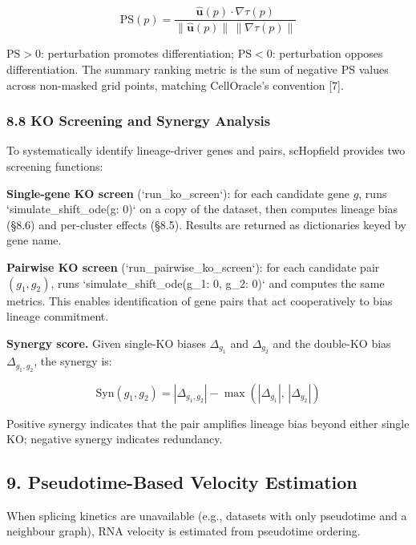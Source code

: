 \documentclass[11pt]{article}
\begin{document}
\begin{equation}
\mathrm{PS}(p) = \frac{\hat{\mathbf{u}}(p) \cdot \nabla\tau(p)}{\|\hat{\mathbf{u}}(p)\|\,\|\nabla\tau(p)\|} 
\end{equation}

$\mathrm{PS} > 0$: perturbation promotes differentiation; $\mathrm{PS} < 0$: perturbation opposes differentiation. The summary ranking metric is the sum of negative PS values across non-masked grid points, matching CellOracle's convention [7].


\subsubsection*{8.8 KO Screening and Synergy Analysis}

To systematically identify lineage-driver genes and pairs, scHopfield provides two screening functions:

\textbf{Single-gene KO screen} (`run\_ko\_screen`): for each candidate gene $g$, runs `simulate\_shift\_ode({g: 0})` on a copy of the dataset, then computes lineage bias (§8.6) and per-cluster effects (§8.5). Results are returned as dictionaries keyed by gene name.

\textbf{Pairwise KO screen} (`run\_pairwise\_ko\_screen`): for each candidate pair $(g_1, g_2)$, runs `simulate\_shift\_ode({g\_1: 0, g\_2: 0})` and computes the same metrics. This enables identification of gene pairs that act cooperatively to bias lineage commitment.

\textbf{Synergy score.} Given single-KO biases $\Delta_{g_1}$ and $\Delta_{g_2}$ and the double-KO bias $\Delta_{g_1,g_2}$, the synergy is:

\begin{equation}
\mathrm{Syn}(g_1, g_2) = |\Delta_{g_1,g_2}| - \max\!\left(|\Delta_{g_1}|,\, |\Delta_{g_2}|\right) 
\end{equation}

Positive synergy indicates that the pair amplifies lineage bias beyond either single KO; negative synergy indicates redundancy.



\subsection*{9. Pseudotime-Based Velocity Estimation}

When splicing kinetics are unavailable (e.g., datasets with only pseudotime and a neighbour graph), RNA velocity is estimated from pseudotime ordering.
\end{document}
